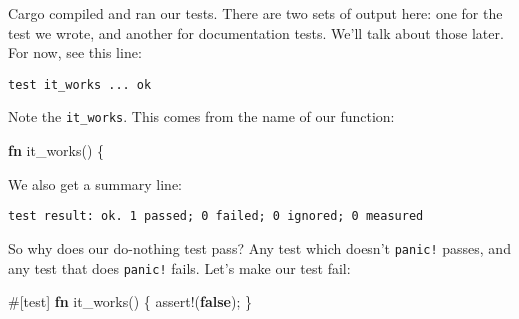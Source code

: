 \documentclass[a4paper,]{book}
\newenvironment{Shaded}{\begin{snugshade}}{\end{snugshade}}
\newcommand{\KeywordTok}[1]{\textcolor[rgb]{0.13,0.29,0.53}{\textbf{{#1}}}}
\newcommand{\OtherTok}[1]{\textcolor[rgb]{0.56,0.35,0.01}{{#1}}}
\newcommand{\NormalTok}[1]{{#1}}
\begin{document}
\begin{Shaded}
\end{Shaded}

Cargo compiled and ran our tests. There are two sets of output here: one
for the test we wrote, and another for documentation tests. We'll talk
about those later. For now, see this line:

\begin{verbatim}
test it_works ... ok
\end{verbatim}

Note the \texttt{it\_works}. This comes from the name of our function:

\begin{Shaded}
\begin{Highlighting}[]
\KeywordTok{fn} \NormalTok{it_works() \{}
\end{Highlighting}
\end{Shaded}

We also get a summary line:

\begin{verbatim}
test result: ok. 1 passed; 0 failed; 0 ignored; 0 measured
\end{verbatim}

So why does our do-nothing test pass? Any test which doesn't
\texttt{panic!} passes, and any test that does \texttt{panic!} fails.
Let's make our test fail:

\begin{Shaded}
\begin{Highlighting}[]
\OtherTok{#[}\NormalTok{test}\OtherTok{]}
\KeywordTok{fn} \NormalTok{it_works() \{}
    \OtherTok{assert!}\NormalTok{(}\KeywordTok{false}\NormalTok{);}
\NormalTok{\}}
\end{Highlighting}
\end{Shaded}
\end{document}
